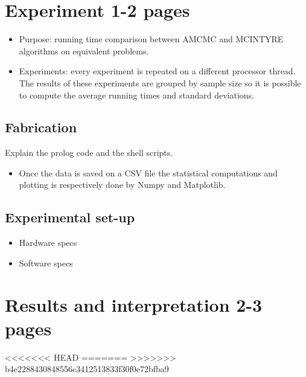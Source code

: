 \documentclass[a4paper]{article}
\begin{document}
\section{Experiment 1-2 pages}
\begin{itemize}
\item Purpose: running time comparison between AMCMC and MCINTYRE algorithms on 
      equivalent problems.
\item Experiments: every experiment is repeated on a different processor 
      thread. The results of these experiments are grouped by sample size so 
      it is possible to compute the average running times and standard 
      deviations.
\end{itemize}

\subsection{Fabrication}
Explain the prolog code and the shell scripts.
\begin{itemize}
\item Once the data is saved on a CSV file the statistical computations and 
      plotting is respectively done by Numpy and Matplotlib.
\end{itemize}

\subsection{Experimental set-up}
\begin{itemize}
    \item Hardware specs
    \item Software specs
\end{itemize}

\section{Results and interpretation 2-3 pages}
<<<<<<< HEAD
=======
>>>>>>> b4e2288430848556c3412513833f30f0e72bfba9
\end{document}
